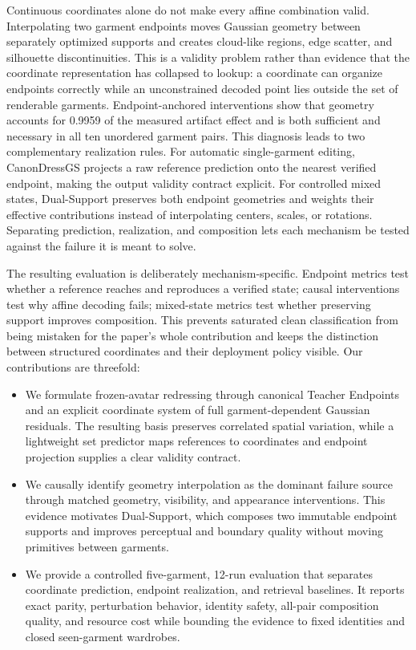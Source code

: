 \documentclass[letterpaper]{article}
\newcommand{\method}{CanonDressGS}
\newcommand{\dual}{Dual-Support}
\begin{document}
Continuous coordinates alone do not make every affine combination valid. Interpolating two garment endpoints moves Gaussian geometry between separately optimized supports and creates cloud-like regions, edge scatter, and silhouette discontinuities. This is a validity problem rather than evidence that the coordinate representation has collapsed to lookup: a coordinate can organize endpoints correctly while an unconstrained decoded point lies outside the set of renderable garments. Endpoint-anchored interventions show that geometry accounts for 0.9959 of the measured artifact effect and is both sufficient and necessary in all ten unordered garment pairs. This diagnosis leads to two complementary realization rules. For automatic single-garment editing, \method{} projects a raw reference prediction onto the nearest verified endpoint, making the output validity contract explicit. For controlled mixed states, \dual{} preserves both endpoint geometries and weights their effective contributions instead of interpolating centers, scales, or rotations. Separating prediction, realization, and composition lets each mechanism be tested against the failure it is meant to solve.

The resulting evaluation is deliberately mechanism-specific. Endpoint metrics test whether a reference reaches and reproduces a verified state; causal interventions test why affine decoding fails; mixed-state metrics test whether preserving support improves composition. This prevents saturated clean classification from being mistaken for the paper's whole contribution and keeps the distinction between structured coordinates and their deployment policy visible. Our contributions are threefold:
\begin{itemize}
    \item We formulate frozen-avatar redressing through canonical Teacher Endpoints and an explicit coordinate system of full garment-dependent Gaussian residuals. The resulting basis preserves correlated spatial variation, while a lightweight set predictor maps references to coordinates and endpoint projection supplies a clear validity contract.
    \item We causally identify geometry interpolation as the dominant failure source through matched geometry, visibility, and appearance interventions. This evidence motivates \dual{}, which composes two immutable endpoint supports and improves perceptual and boundary quality without moving primitives between garments.
    \item We provide a controlled five-garment, 12-run evaluation that separates coordinate prediction, endpoint realization, and retrieval baselines. It reports exact parity, perturbation behavior, identity safety, all-pair composition quality, and resource cost while bounding the evidence to fixed identities and closed seen-garment wardrobes.
\end{itemize}
\end{document}
